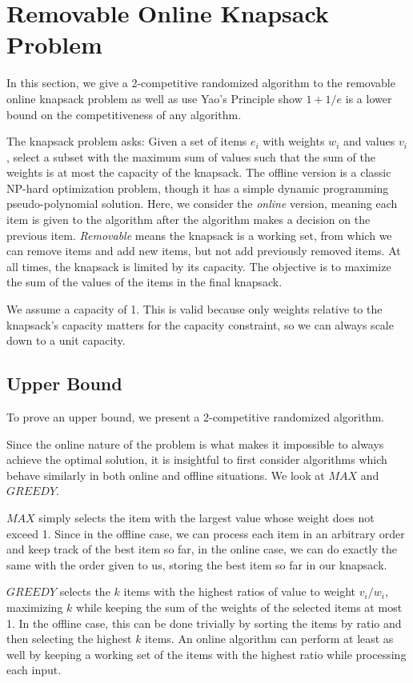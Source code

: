 \section{Removable Online Knapsack Problem}
In this section, we give a 2-competitive randomized algorithm to the removable online knapsack problem as well as use Yao's Principle show $1+1/e$ is a lower bound on the competitiveness of any algorithm.

The knapsack problem asks: Given a set of items $e_i$ with weights $w_i$ and values $v_i$, select a subset with the maximum sum of values such that the sum of the weights is at most the capacity of the knapsack. The offline version is a classic NP-hard optimization problem, though it has a simple dynamic programming pseudo-polynomial solution. Here, we consider the \emph{online} version, meaning each item is given to the algorithm after the algorithm makes a decision on the previous item. \emph{Removable} means the knapsack is a working set, from which we can remove items and add new items, but not add previously removed items. At all times, the knapsack is limited by its capacity. The objective is to maximize the sum of the values of the items in the final knapsack.

We assume a capacity of 1. This is valid because only weights relative to the knapsack's capacity matters for the capacity constraint, so we can always scale down to a unit capacity.

\subsection{Upper Bound} %
To prove an upper bound, we present a 2-competitive randomized algorithm.

Since the online nature of the problem is what makes it impossible to always achieve the optimal solution, it is insightful to first consider algorithms which behave similarly in both online and offline situations. We look at $MAX$ and $GREEDY$.

$MAX$ simply selects the item with the largest value whose weight does not exceed 1. Since in the offline case, we can process each item in an arbitrary order and keep track of the best item so far, in the online case, we can do exactly the same with the order given to us, storing the best item so far in our knapsack.

$GREEDY$ selects the $k$ items with the highest ratios of value to weight $v_i/w_i$, maximizing $k$ while keeping the sum of the weights of the selected items at most 1. In the offline case, this can be done trivially by sorting the items by ratio and then selecting the highest $k$ items. An online algorithm can perform at least as well by keeping a working set of the items with the highest ratio while processing each input.

